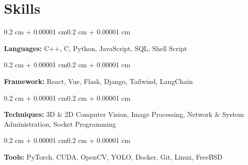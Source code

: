 \documentclass[10pt, letterpaper]{article}
\newenvironment{highlights}{
    \begin{itemize}[
        topsep=0.05 cm,
        parsep=0.05 cm,
        partopsep=0pt,
        itemsep=0pt,
        leftmargin=0.4 cm + 10pt
    ]
}{
    \end{itemize}
}
\newenvironment{onecolentry}{
    \begin{adjustwidth}{0.2 cm + 0.00001 cm}{0.2 cm + 0.00001 cm}
}{
    \end{adjustwidth}
}
\newenvironment{twocolentry}[2][]{
    \onecolentry
    \def\secondColumn{#2}
    \setcolumnwidth{\fill, 4.5 cm}
    \begin{paracol}{2}
}{
    \switchcolumn \raggedleft \secondColumn
    \end{paracol}
    \endonecolentry
}
\let\hrefWithoutArrow\href
\renewcommand{\href}[2]{\hrefWithoutArrow{#1}{\ifthenelse{\equal{#2}{}}{ }{#2 }\raisebox{.15ex}{\footnotesize \faExternalLink*}}}
\begin{document}



    \section{Skills}
        \begin{onecolentry}
            \textbf{Languages:} C++, C, Python, JavaScript, SQL, Shell Script
        \end{onecolentry}
        
        \vspace{0.15 cm}
        \begin{onecolentry}
            \textbf{Framework:} React, Vue, Flask, Django, Tailwind, LangChain
        \end{onecolentry}
        
        \vspace{0.15 cm}
        \begin{onecolentry}
            \textbf{Techniques:} 3D \& 2D Computer Vision, Image Processing, Network \& System Administration, Socket Programming
        \end{onecolentry}

        \vspace{0.15 cm}
        \begin{onecolentry}
            \textbf{Tools:} PyTorch, CUDA, OpenCV, YOLO, Docker, Git, Linux, FreeBSD
        \end{onecolentry}
\end{document}
